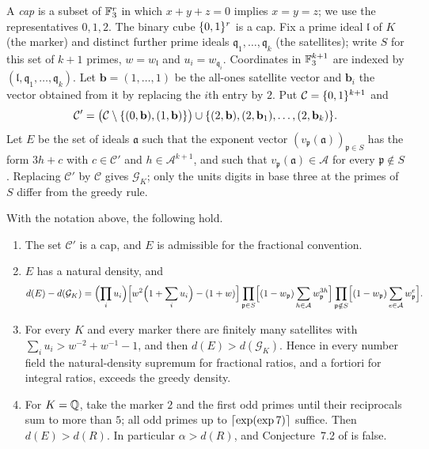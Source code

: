 A \emph{cap} is a subset of $\mathbb{F}_3^{r}$ in which $x+y+z=0$ implies $x=y=z$; we use the
representatives $0,1,2$. The binary cube $\{0,1\}^{r}$ is a cap. Fix a prime ideal
$\mathfrak l$ of $K$ (the marker) and distinct further prime ideals
$\mathfrak q_1,\dots,\mathfrak q_k$ (the satellites); write $S$ for this set of $k+1$ primes,
$w=w_{\mathfrak l}$ and $u_i=w_{\mathfrak q_i}$. Coordinates in $\mathbb{F}_3^{k+1}$ are indexed by
$(\mathfrak l,\mathfrak q_1,\dots,\mathfrak q_k)$. Let $\mathbf b=(1,\dots,1)$ be the
all-ones satellite vector and $\mathbf b_i$ the vector obtained from it by replacing the
$i$th entry by $2$. Put $\mathcal C=\{0,1\}^{k+1}$ and
\begin{equation}\label{gpi:eq:capC}
 \mathcal C'=\bigl(\mathcal C\setminus\{(0,\mathbf b),(1,\mathbf b)\}\bigr)\cup
 \{(2,\mathbf b),(2,\mathbf b_1),\dots,(2,\mathbf b_k)\} .
\end{equation}
Let $E$ be the set of ideals $\mathfrak a$ such that the exponent vector
$(v_{\mathfrak p}(\mathfrak a))_{\mathfrak p\in S}$ has the form $3h+c$ with
$c\in\mathcal C'$ and $h\in\mathcal A^{k+1}$, and such that
$v_{\mathfrak p}(\mathfrak a)\in\mathcal A$ for every $\mathfrak p\notin S$. Replacing
$\mathcal C'$ by $\mathcal C$ gives $\mathcal G_K$; only the units digits in base three at
the primes of $S$ differ from the greedy rule.

\begin{theorem}\label{gpi:thm:onedigit}
With the notation above, the following hold.
\begin{enumerate}[label=\textup{(\alph*)}]
\item The set $\mathcal C'$ is a cap, and $E$ is admissible for the fractional convention.
\item $E$ has a natural density, and
\begin{equation}\label{gpi:eq:capgain}
 d(E)-d(\mathcal G_K)=\Bigl(\prod_iu_i\Bigr)
 \Bigl[w^2\Bigl(1+\sum_iu_i\Bigr)-(1+w)\Bigr]
 \prod_{\mathfrak p\in S}\Bigl[(1-w_{\mathfrak p})\sum_{h\in\mathcal A}w_{\mathfrak p}^{3h}\Bigr]
 \prod_{\mathfrak p\notin S}\Bigl[(1-w_{\mathfrak p})\sum_{e\in\mathcal A}w_{\mathfrak p}^{e}\Bigr].
\end{equation}
\item For every $K$ and every marker there are finitely many satellites with
 $\sum_iu_i>w^{-2}+w^{-1}-1$, and then $d(E)>d(\mathcal G_K)$. Hence in every number field
 the natural-density supremum for fractional ratios, and a fortiori for integral ratios,
 exceeds the greedy density.
\item For $K=\mathbb{Q}$, take the marker $2$ and the first odd primes until their reciprocals sum to
 more than $5$; all odd primes up to $\lceil\exp(\exp7)\rceil$ suffice. Then $d(E)>d(R)$. In
 particular $\alpha>d(R)$, and Conjecture~7.2 of \cite{McNew2015Sets} is false.
\end{enumerate}
\end{theorem}

